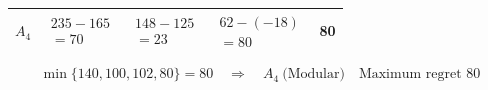 {\begin{minipage}[t]{0.51\textwidth}
\begin{tabular}{@{}lcccc@{}}
    $A_4$ & $\begin{gathered}235-165\\=70\end{gathered}$ & $\begin{gathered}148-125\\=23\end{gathered}$ & $\begin{gathered}62-(-18)\\=80\end{gathered}$ & 80\\
    \bottomrule
  \end{tabular}
\end{minipage}
\[
  \min\{140,100,102,80\}=80
  \quad\Longrightarrow\quad
  \boxed{A_4\ \text{(Modular)}\quad\text{Maximum regret }80}
\]
}

\clearpage
{}
